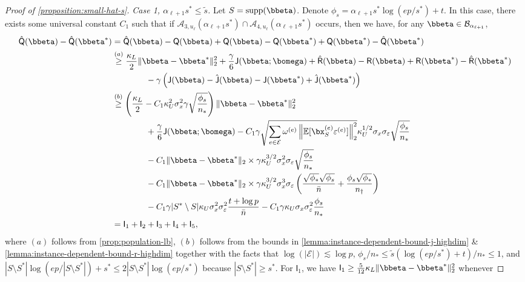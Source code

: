 \documentclass[10pt]{article}
\numberwithin{equation}{section}
\newcommand*{\supp}{\mathrm{supp}}
\begin{document}
\begin{proof}[Proof of \cref{proposition:small-hat-s}]
\noindent \emph{Case 1, $\alpha_{\ell+1} s^* \le \tilde{s}$.} Let $S=\supp(\bbeta)$. Denote $\phi_s=\alpha_{\ell+1} s^* \log(ep/s^*) + t$. In this case, there exists some universal constant $C_1$ such that if $\mathcal{A}_{3,u_{\ell}}(\alpha_{\ell+1}s^*) \cap \mathcal{A}_{4,u_{\ell}}(\alpha_{\ell+1}s^*)$ occurs, then we have, for any $\bbeta \in \mathcal{B}_{\alpha_{\ell+1}}$,
\begin{align*}
    \hat{\mathsf{Q}}(\bbeta) - \hat{\mathsf{Q}}(\bbeta^*) &= \hat{\mathsf{Q}}(\bbeta) - \mathsf{Q}(\bbeta) + \mathsf{Q}(\bbeta) - \mathsf{Q}(\bbeta^*) + \mathsf{Q}(\bbeta^*) - \hat{\mathsf{Q}}(\bbeta^*) \\
    &\overset{(a)}{\ge} \frac{\kappa_L}{2} \|\bbeta - \bbeta^*\|_2^2 + \frac{\gamma}{6} \mathsf{J}(\bbeta; \bomega) + \hat{\mathsf{R}}(\bbeta) - \mathsf{R}(\bbeta) + \mathsf{R} (\bbeta^*) - \hat{\mathsf{R}} (\bbeta^*) \\
    & ~~~~~~~~~~~~ - \gamma \left(\mathsf{J}(\bbeta) - \hat{\mathsf{J}}(\bbeta) - \mathsf{J}(\bbeta^*) + \hat{\mathsf{J}}(\bbeta^*)\right)\\
    &\overset{(b)}{\ge} \left(\frac{\kappa_L}{2} - C_1 \kappa_U^2\sigma_x^2 \gamma \sqrt{\frac{\phi_s}{n_*}}\right) \|\bbeta - \bbeta^*\|_2^2 \\
    & ~~~~~~~~~~~~ + \frac{\gamma}{6} \mathsf{J}(\bbeta;\bomega) - C_1 \gamma \sqrt{\sum_{e\in \mathcal{E}} \omega^{(e)} \left\|\mathbb{E}[\bx_{S}^{(e)} \varepsilon^{(e)}]\right\|_2^2} \kappa_U^{1/2} \sigma_x\sigma_\varepsilon \sqrt{\frac{\phi_s}{n_*}} \\
    & ~~~~~~~~~~~~ - C_1 \|\bbeta - \bbeta^*\|_2 \times \gamma \kappa_U^{3/2} \sigma_x^2 \sigma_\varepsilon \sqrt{\frac{\phi_s}{n_*}} \\
    & ~~~~~~~~~~~~ - C_1 \|\bbeta - \bbeta^*\|_2 \times \gamma \kappa_U^{3/2} \sigma_x^3 \sigma_\varepsilon \left(\frac{\sqrt{\phi_*} \sqrt{\phi_s}}{\bar{n}} + \frac{\phi_s \sqrt{\phi_*}}{n_\dagger} \right) \\
    & ~~~~~~~~~~~~ - C_1 \gamma |S^*\setminus S| \kappa_U \sigma_x^2 \sigma_\varepsilon^2 \frac{t+ \log p}{\bar{n}} - C_1 \gamma \kappa_U \sigma_x \sigma_\varepsilon^2 \frac{\phi_s}{n_*} \\
    &= \mathsf{I}_1 + \mathsf{I}_2 + \mathsf{I}_3 + \mathsf{I}_4 + \mathsf{I}_5,
\end{align*} where $(a)$ follows from \cref{prop:population-lb}, $(b)$ follows from the bounds in \cref{lemma:instance-dependent-bound-j-highdim} \& \ref{lemma:instance-dependent-bound-r-highdim} together with the facts that $\log(|\mathcal{E}|) \lesssim \log p$, $\phi_s/n_* \le \tilde{s}(\log(ep/s^*)+t)/ n_* \le 1$, and $|S\setminus S^*| \log(ep/|S\setminus S^*|) + s^* \le 2|S\setminus S^*| \log(ep/s^*) $ because $|S\setminus S^*| \ge s^*$. For $\mathsf{I}_1$, we have $\mathsf{I}_1 \ge \frac{5}{12}\kappa_L \|\bbeta - \bbeta^*\|_2^2$ whenever

\end{proof}
\end{document}
